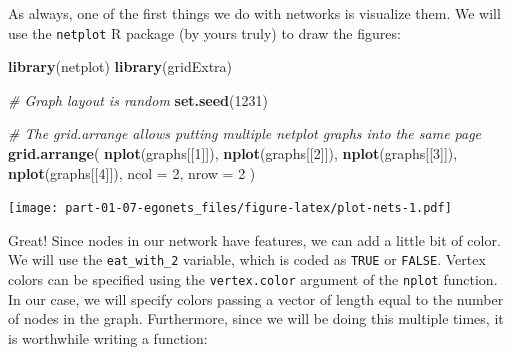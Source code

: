 \documentclass[
]{book}
\newenvironment{Shaded}{\begin{snugshade}}{\end{snugshade}}
\newcommand{\AttributeTok}[1]{\textcolor[rgb]{0.13,0.29,0.53}{#1}}
\newcommand{\CommentTok}[1]{\textcolor[rgb]{0.56,0.35,0.01}{\textit{#1}}}
\newcommand{\ControlFlowTok}[1]{\textcolor[rgb]{0.13,0.29,0.53}{\textbf{#1}}}
\newcommand{\DecValTok}[1]{\textcolor[rgb]{0.00,0.00,0.81}{#1}}
\newcommand{\FunctionTok}[1]{\textcolor[rgb]{0.13,0.29,0.53}{\textbf{#1}}}
\newcommand{\NormalTok}[1]{#1}
\newcommand{\OtherTok}[1]{\textcolor[rgb]{0.56,0.35,0.01}{#1}}
\newcommand{\SpecialCharTok}[1]{\textcolor[rgb]{0.81,0.36,0.00}{\textbf{#1}}}
\newcommand{\StringTok}[1]{\textcolor[rgb]{0.31,0.60,0.02}{#1}}
\begin{document}
As always, one of the first things we do with networks is visualize them. We will use the \texttt{netplot} R package (by yours truly) to draw the figures:

\begin{Shaded}
\begin{Highlighting}[]
\FunctionTok{library}\NormalTok{(netplot)}
\FunctionTok{library}\NormalTok{(gridExtra)}

\CommentTok{\# Graph layout is random}
\FunctionTok{set.seed}\NormalTok{(}\DecValTok{1231}\NormalTok{)}

\CommentTok{\# The grid.arrange allows putting multiple netplot graphs into the same page}
\FunctionTok{grid.arrange}\NormalTok{(}
  \FunctionTok{nplot}\NormalTok{(graphs[[}\DecValTok{1}\NormalTok{]]),}
  \FunctionTok{nplot}\NormalTok{(graphs[[}\DecValTok{2}\NormalTok{]]),}
  \FunctionTok{nplot}\NormalTok{(graphs[[}\DecValTok{3}\NormalTok{]]),}
  \FunctionTok{nplot}\NormalTok{(graphs[[}\DecValTok{4}\NormalTok{]]),}
  \AttributeTok{ncol =} \DecValTok{2}\NormalTok{, }\AttributeTok{nrow =} \DecValTok{2}
\NormalTok{)}
\end{Highlighting}
\end{Shaded}

\texttt{[image: part-01-07-egonets\_files/figure-latex/plot-nets-1.pdf]}

Great! Since nodes in our network have features, we can add a little bit of color. We will use the \texttt{eat\_with\_2} variable, which is coded as \texttt{TRUE} or \texttt{FALSE}. Vertex colors can be specified using the \texttt{vertex.color} argument of the \texttt{nplot} function. In our case, we will specify colors passing a vector of length equal to the number of nodes in the graph. Furthermore, since we will be doing this multiple times, it is worthwhile writing a function:

\begin{Shaded}
\end{Shaded}
\end{document}
